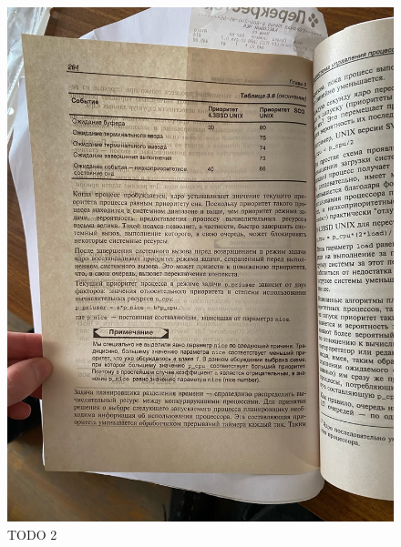\begin{figure}[h]
	\centering
	\captionsetup{justification=centering}
	\includegraphics[width=150mm]{img/todo2.jpeg}
	\caption{TODO 2}
	\label{fig:todo2}
\end{figure}

